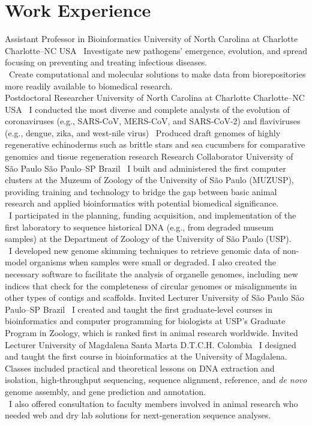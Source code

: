 \documentclass[11pt, letterpaper, sans]{moderncv}
\begin{document}
\section{Work Experience}
{Assistant Professor in Bioinformatics}
{University of North Carolina at Charlotte}
{Charlotte--NC}
{USA}
{
\textbullet~Investigate new pathogens' emergence, evolution, and spread focusing on preventing and treating infectious diseases.\\
\textbullet~Create computational and molecular solutions to make data from biorepositories more readily available to biomedical research.\\
}
%
{Postdoctoral Researcher}
{University of North Carolina at Charlotte}
{Charlotte--NC}
{USA}
{
\textbullet~I conducted the most diverse and complete analysts of the evolution of coronaviruses (e.g., SARS-CoV, MERS-CoV, and SARS-CoV-2) and flaviviruses (e.g., dengue, zika, and west-nile virus)
\textbullet~Produced draft genomes of highly regenerative echinoderms such as brittle stars and sea cucumbers for
comparative genomics and tissue regeneration research
}
%
{Research Collaborator}
{University of São Paulo}
{São Paulo--SP}
{Brazil}
{
\textbullet~I built and administered the first computer clusters at the Muzeum of Zoology of the University of São Paulo (MUZUSP), providing training and technology to bridge the gap between basic animal research and applied bioinformatics with potential biomedical significance.\\
\textbullet~I participated in the planning, funding acquisition, and implementation of the first laboratory to sequence historical DNA (e.g., from degraded museum samples) at the Department of Zoology of the University of São Paulo (USP).\\
\textbullet~I developed new genome skimming techniques to retrieve genomic data of non-model organisms when samples were small or degraded. I also created the necessary software to facilitate the analysis of organelle genomes, including new indices that check for the completeness of circular genomes or misalignments in other types of contigs and scaffolds.
}
%
{Invited Lecturer}
{University of São Paulo}
{São Paulo--SP}
{Brazil}
{
\textbullet~I created and taught the first graduate-level courses in bioinformatics and computer programming for biologists at USP's Graduate Program in Zoology, which is ranked first in animal research worldwide.
}
%
{Invited Lecturer}
{University of Magdalena}
{Santa Marta D.T.C.H.}
{Colombia}
{
\textbullet~I designed and taught the first course in bioinformatics at the University of Magdalena. Classes included practical and theoretical lessons on DNA extraction and isolation, high-throughput sequencing, sequence alignment, reference, and \textit{de novo} genome assembly, and gene prediction and annotation.\\
\textbullet~I also offered consultation to faculty members involved in animal research who needed web and dry lab solutions for next-generation sequence analyses.
}
\end{document}
